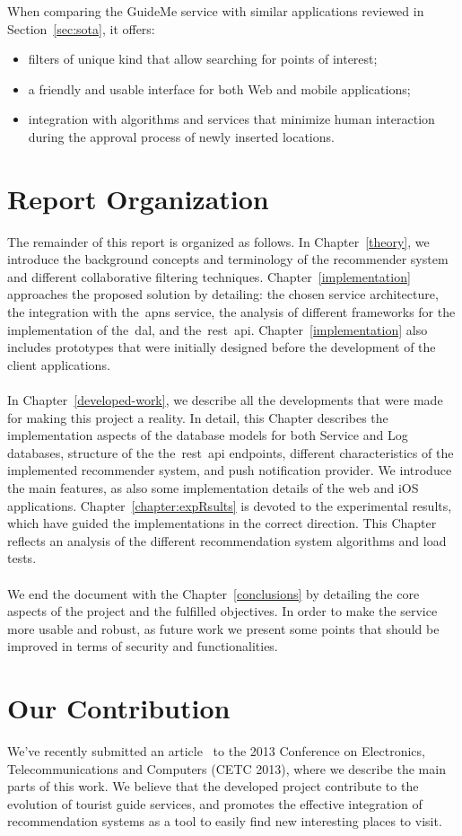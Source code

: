 When comparing the GuideMe service with similar applications reviewed in Section~\ref{sec:sota}, it offers:
\begin{itemize}
	\item filters of unique kind that allow searching for points of interest;
	\item a friendly and usable interface for both Web and mobile applications;
	\item integration with algorithms and services that minimize human interaction during the approval process of newly inserted locations.
\end{itemize}

\section{Report Organization}
\label{sec:reportOrganization}
The remainder of this report is organized as follows. In Chapter~\ref{theory}, we introduce the background concepts and terminology of the recommender system and different collaborative filtering techniques. Chapter~\ref{implementation} approaches the proposed solution by detailing: the chosen service architecture, the integration with the~\gls{apns} service, the analysis of different frameworks for the implementation of the~\gls{dal}, and the~\gls{rest}~\gls{api}. Chapter~\ref{implementation} also includes prototypes that were initially designed before the development of the client applications.\\
\\
In Chapter~\ref{developed-work}, we describe all the developments that were made for making this project a reality. In detail, this Chapter describes the implementation aspects of the database models for both Service and Log databases, structure of the the~\gls{rest}~\gls{api} endpoints, different characteristics of the implemented recommender system, and push notification provider. We introduce the main features, as also some implementation details of the web and iOS applications. Chapter~\ref{chapter:expRsults} is devoted to the experimental results, which have guided the implementations in the correct direction. This Chapter reflects an analysis of the different recommendation system algorithms and load tests.\\
\\
We end the document with the Chapter~\ref{conclusions} by detailing the core aspects of the project and the fulfilled objectives. In order to make the service more usable and robust, as future work we present some points that should be improved in terms of security and functionalities.

\section{Our Contribution}
\label{sec:ourContribution}
We've recently submitted an article~\cite{guideMeArticle} to the 2013 Conference on Electronics, Telecommunications and Computers (CETC 2013), where we describe the main parts of this work. We believe that the developed project contribute to the evolution of tourist guide services, and promotes the effective integration of recommendation systems as a tool to easily find new interesting places to visit.
\fi